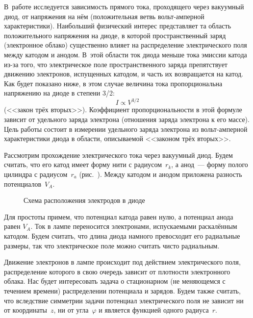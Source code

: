 
В~работе исследуется зависимость прямого тока, проходящего через вакуумный диод,
от напряжения на нём (положительная ветвь вольт-амперной характеристики).
Наибольший физический интерес представляет та область положительного напряжения
на диоде, в которой пространственный заряд (электронное облако) существенно
влияет на распределение электрического поля между катодом и анодом. В~этой
области ток диода меньше тока эмиссии катода из-за того, что электрическое поле
пространственного заряда препятствует движению электронов, испущенных катодом, и
часть их возвращается на катод. Как будет показано ниже, в этом случае величина
тока пропорциональна напряжению на диоде в степени 3/2:
\begin{equation}
	I\propto V^{3/2}
\end{equation}
(<<закон трёх вторых>>). Коэффициент пропорциональности в этой формуле зависит
от удельного заряда электрона (отношения заряда электрона к его массе). Цель
работы состоит в измерении удельного заряда электрона из вольт-амперной
характеристики диода в области, описываемой <<законом трёх вторых>>.

Рассмотрим прохождение электрического тока через вакуумный диод. Будем считать,
что его катод имеет форму нити с
радиусом~$r_k$, а анод~--- форму полого цилиндра с радиусом~$r_a$
(рис.~). Между катодом и анодом приложена разность
потенциалов~$V_A$.
\begin{figure}[h!]
	\caption{Схема расположения электродов в диоде}
\end{figure}

Для простоты примем, что потенциал катода равен нулю, а потенциал анода равен
$V_A$. Ток в лампе переносится
электронами, испускаемыми раскалённым катодом. Будем считать, что длина диода
намного превосходит его радиальные
размеры, так что электрическое поле можно считать чисто радиальным.

Движение электронов в лампе происходит под действием электрического поля,
распределение которого в свою очередь зависит от плотности электронного облака.
Нас будет интересовать задача о стационарном (не меняющемся с течением времени)
распределении потенциала и зарядов. Будем также считать, что вследствие
симметрии задачи потенциал электрического поля не зависит ни от координаты~$z$,
ни от угла~$\varphi$ и является функцией одного радиуса~$r$.

